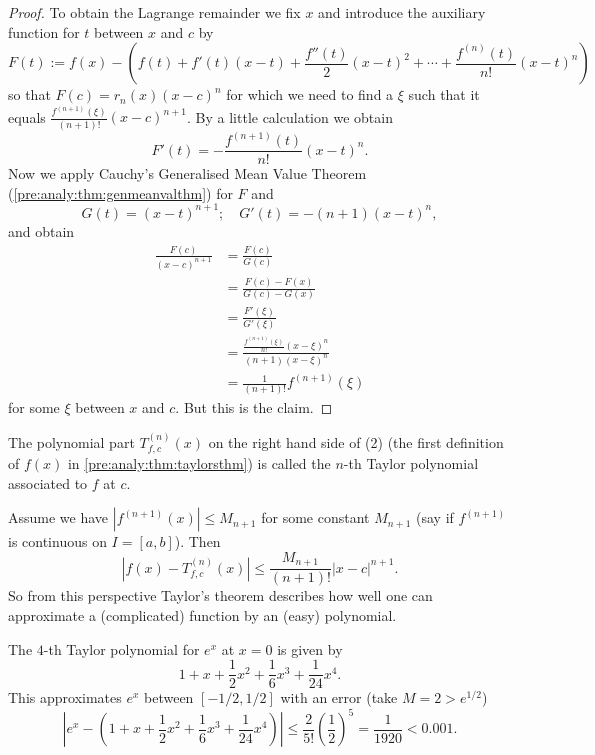 \documentclass[10pt, a4paper]{article}
\begin{document}
\begin{theorem}
\begin{proof}
        To obtain the Lagrange remainder we fix $x$ and introduce the auxiliary function for $t$ between $x$ and $c$ by
        \[
        F(t) := f(x) - \left(f(t) + f'(t)(x - t) + \frac{f''(t)}{2}(x - t) ^ 2 + \dotsi + \frac{f ^ {(n)}(t)}{n!}(x - t) ^ n\right)
        \]
        so that $F(c) = r_n(x)(x - c) ^ n$ for which we need to find a $\xi$ such that it equals $\frac{f ^ {(n + 1)}(\xi)}{(n + 1)!}(x - c) ^ {n + 1}$.
        By a little calculation we obtain
        \[
        F'(t) = -\frac{f ^ {(n + 1)}(t)}{n!}(x - t) ^ {n}.
        \]
        Now we apply Cauchy's Generalised Mean Value Theorem
        (\autoref{pre:analy:thm:genmeanvalthm})
        for $F$ and
        \[
        G(t) = (x - t) ^ {n + 1};\quad G'(t) = -(n + 1)(x - t) ^ n,
        \]
        and obtain
        \begin{align*}
            \frac{F(c)}{(x - c) ^ {n + 1}} &= \frac{F(c)}{G(c)} \\
            &= \frac{F(c) - F(x)}{G(c) - G(x)} \\
            &= \frac{F'(\xi)}{G'(\xi)} \\
            &= \frac{\frac{f ^ {(n + 1)}(\xi)}{n!}(x - \xi) ^ n}{(n + 1)(x - \xi) ^ n} \\
            &= \frac{1}{(n + 1)!}f ^ {(n + 1)}(\xi)
        \end{align*}
        for some $\xi$ between $x$ and $c$.
        But this is the claim.
    \end{proof}
\end{theorem}

\begin{corollary}
    The polynomial part $T_{f, c}^{(n)}(x)$ on the right hand side of (2)
    (the first definition of $f(x)$ in \autoref{pre:analy:thm:taylorsthm}) 
    is called the $n$-th Taylor polynomial associated to $f$ at $c$.
\end{corollary}

Assume we have $|f ^ {(n + 1)}(x)| \leq M_{n + 1}$ for some constant $M_{n + 1}$
(say if $f ^ {(n + 1)}$ is continuous on $I = [a, b]$).
Then
\[
|f(x) - T_{f, c}^{(n)}(x)| \leq \frac{M_{n + 1}}{(n + 1)!}|x - c| ^ {n + 1}.
\]
So from this perspective Taylor's theorem describes how well one can approximate a
(complicated)
function by an
(easy)
polynomial.

\begin{example}
    The $4$-th Taylor polynomial for $e ^ x$ at $x = 0$ is given by
    \[
    1 + x + \frac{1}{2}x ^ 2 + \frac{1}{6}x ^ 3 + \frac{1}{24}x ^ 4.
    \]
    This approximates $e ^ x$ between $[-1 / 2, 1 / 2]$ with an error
    (take $M = 2 > e ^ {1 / 2}$)
    \[
    \left|e ^ {x} - \left(1 + x + \frac{1}{2}x ^ 2 + \frac{1}{6}x ^ 3 + \frac{1}{24}x ^ 4\right)\right| \leq \frac{2}{5!}\left(\frac{1}{2}\right) ^ 5 = \frac{1}{1920} < 0.001.
    \]
\end{example}
\end{document}
